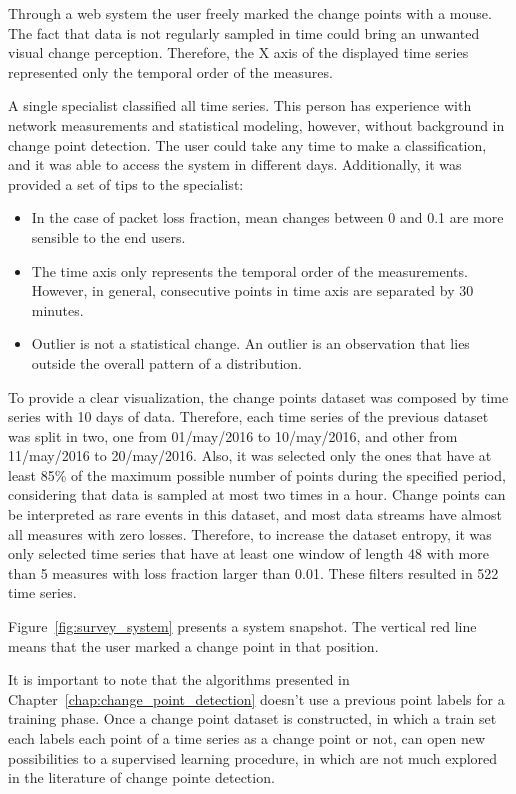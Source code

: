 Through a web system the user freely marked the change points with a mouse.
The fact that data is not regularly sampled in time could bring an unwanted
visual change perception. Therefore, the X axis of the displayed time series
represented only the temporal order of the measures.

A single specialist classified all time series.
This person has experience with network measurements and statistical modeling,
however, without background in change point detection.
The user could take any time to make a classification, and it was able to access
the system in different days. Additionally, it was provided a set of tips to the
specialist:

\begin{itemize}
    \item In the case of packet loss fraction, mean changes between 0 and 0.1
    are more sensible to the end users.
    \item The time axis only represents the temporal order of the measurements.
    However, in general, consecutive points in time axis are separated by 30
    minutes.
    \item Outlier is not a statistical change. An outlier is an observation that
    lies outside the overall pattern of a distribution.
\end{itemize}

To provide a clear visualization, the change points dataset was composed by time
series with 10 days of data. Therefore, each time series of the previous dataset
was split in two, one from 01/may/2016 to 10/may/2016, and other from
11/may/2016 to 20/may/2016. Also, it was selected only the ones that have at
least 85\% of the maximum possible number of points during the specified period,
considering that data is sampled at most two times in a hour. Change points can
be interpreted as rare events in this dataset, and most data streams have almost
all measures with zero losses. Therefore, to increase the dataset entropy,
it was only selected time series that have at least one window of length 48 with
more than 5 measures with loss fraction larger than 0.01. These filters resulted
in 522 time series.

Figure~\ref{fig:survey_system} presents a system snapshot.
The vertical red line means that the user marked a change point in that
position.

It is important to note that the algorithms presented in
Chapter~\ref{chap:change_point_detection} doesn't use a previous point labels
for a training phase. Once a change point dataset is constructed, in which a
train set each labels each point of a time series as a change point or not, can
open new possibilities to a supervised learning procedure, in which are not
much explored in the literature of change pointe detection.

